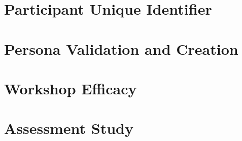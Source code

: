 \documentclass[doublespace,draft,nopageskip]{VTthesis} %
\begin{document}
	\begin{appendices}
        \chapter{Participant Unique Identifier} \label{app:participant-id}
            
		\chapter{Persona Validation and Creation} \label{app:persona_validation_creation}
            
		\chapter{Workshop Efficacy} \label{app:workshop_efficacy}
            
        \chapter{Assessment Study} \label{app:exercises}
            
	\end{appendices}
\end{document}
